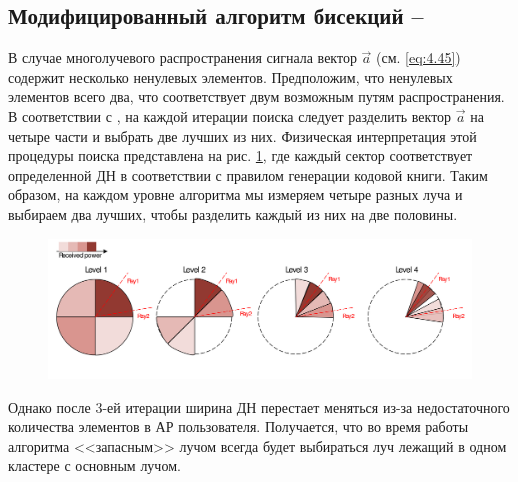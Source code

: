 \subsection[Модифицированный алгоритм бисекций]{Модифицированный алгоритм бисекций -- \ACS{}}
\label{sec:Compressive:multipath}
В случае многолучевого распространения сигнала вектор $\vec a$  (см. \eqref{eq:4.45}) содержит
несколько ненулевых элементов. Предположим, что ненулевых элементов всего два, что соответствует
двум возможным путям распространения.
В соответствии с \cite{Alkhateeb2014}, на
каждой итерации поиска следует разделить вектор $\vec a$ на четыре части и
выбрать две лучших из них.  Физическая интерпретация этой процедуры поиска
представлена на рис. \ref{fig:4.27}, где каждый сектор соответствует определенной
ДН в соответствии с правилом генерации кодовой книги. Таким
образом, на каждом уровне алгоритма мы измеряем четыре разных луча и выбираем
два лучших, чтобы разделить каждый из них на две половины.
\begin{figure}[h!]
    \centering
    \includegraphics[width=\linewidth]{figs/fig4.27}
    \caption{}
    \label{fig:4.27}
\end{figure}
Однако после 3-ей итерации ширина ДН перестает меняться из-за недостаточного количества
элементов в АР пользователя. Получается, что
во время работы алгоритма <<запасным>> лучом всегда будет выбираться
луч лежащий в одном кластере с основным лучом.

